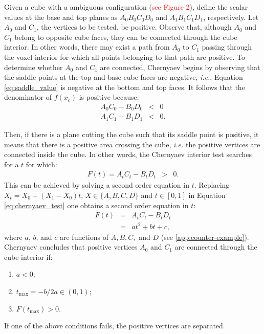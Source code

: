Given a cube with a ambiguous configuration (\textcolor{red}{see Figure 2}), define the scalar values at the base and top planes as $A _{0}B_{0}C_{0}D_{0}$ and $A _{1}B_{1}C_{1}D_{1}$, respectively.  Let $A_{0}$ and $C_{1}$, the vertices to be tested, be positive. Observe that, although $A_{0}$ and $C_{1}$ belong to opposite cube faces, they can be connected through the cube interior. In other words, there may exist a path from $A_0$ to $C_1$ passing through the voxel interior for which all points belonging to that path are positive. To determine whether $A_0$ and $C_1$ are connected, Chernyaev begins by observing that the saddle points at the top and base cube faces are negative, \emph{i.e.}, Equation \eqref{eq:saddle_value} is negative at the bottom and top faces. It follows that the denominator of $f(x_c)$ is positive because:
%
%
\begin{eqnarray}
A_0C_0 - B_0D_0 &<& 0 \label{eq:condition1}\\
A_1C_1 - B_1D_1 &<& 0 \label{eq:condition2}.
\end{eqnarray}
%

Then, if there is a plane cutting the cube such that its saddle point is positive, it means that there is a positive area crossing the cube,  \emph{i.e.}  the positive vertices are connected inside the cube.  In other words, the Chernyaev interior test searches for a $t$ for which:
\begin{eqnarray}
F(t) = A_tC_t-B_tD_t &>& 0. \label{eq:chernyaev_test}
\end{eqnarray}
This can be achieved by solving a second order equation in $t$. Replacing $X_t = X_0 + (X_1-X_0)t$,  $X \in \{A, B, C, D\}$ and $t \in [0,1]$ in Equation \eqref{eq:chernyaev_test} one obtains a second order equation in $t$:
\begin{eqnarray}
F(t) &=& A_tC_t-B_tD_t\\
       &=& a t^2 + b t + c  \label{eq:disambiguation},
\end{eqnarray}
where $a$, $b$, and $c$ are functions of $A, B, C,$ and $D$ (see \ref{app:counter-example}). Chernyaev concludes that positive vertices $A_0$ and $C_1$ are connected through the cube interior if: 
\begin{enumerate}
\item $a < 0$;
\item $t_{\mathrm{max}} = -b / 2a \in (0,1)$; 
\item $F(t_{\mathrm{max}}) > 0$. 
\end{enumerate}
If one of the above conditions fails, the positive vertices are separated.

